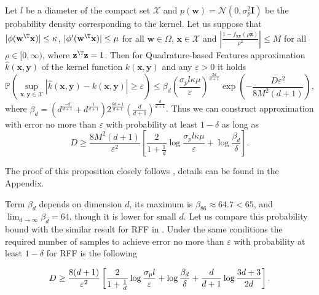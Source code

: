 \begin{proposition}
\label{prop:error_probability_bound}
Let $l$ be a diameter of the compact set $\mathcal{X}$ and 
$p(\mathbf{w}) = \mathcal{N}(0, \sigma_p^2 \mathbf{I})$ be the probability density corresponding to the kernel. Let us suppose that $|\phi(\mathbf{w}^{\T}\mathbf{x})| \leq \kappa$,
$|\phi'(\mathbf{w}^{\T} \mathbf{x})| \leq \mu$ for all $\mathbf{w} \in \Omega$,
$\mathbf{x} \in \mathcal{X}$ and
$\left |\frac{1 - f_{\mathbf{xy}}(\rho \mathbf{z})}{\rho^2} \right | \leq M$ for all $\rho \in [0, \infty)$, where $\mathbf{z}^{\T}\mathbf{z} = 1$. Then for Quadrature-based Features approximation $\hat{k}(\mathbf{x}, \mathbf{y})$ of the kernel function
$k(\mathbf{x}, \mathbf{y})$ and any $\varepsilon > 0$ it holds
\[
\mathbb{P} \left ( \sup_{\mathbf{x}, \mathbf{y} \in \mathcal{X}}|
\hat{k}(\mathbf{x}, \mathbf{y}) - k(\mathbf{x}, \mathbf{y})| \geq \varepsilon \right ) \leq
\beta_d
\left ( \frac{\sigma_p l \kappa \mu}{\varepsilon} \right )^{\frac{2d}{d + 1}}
\exp \left ( -\frac{D\varepsilon^2}{8M^2(d + 1)} \right ),
\]
where $\beta_d = \left (d^{\frac{-d}{d + 1}} + d^{\frac{1}{d + 1}}\right ) 2^\frac{6d + 1}{d + 1}
\left ( \frac{d}{d + 1} \right)^{\frac{d}{d + 1}}$. Thus we can construct approximation with error no more than $\varepsilon$ with probability at least $1 - \delta$ as long as
\[
D \geq \frac{8M^2(d + 1)}{\varepsilon^2} \left [
\frac{2}{1 + \frac{1}{d}}\log \frac{\sigma_p l \kappa \mu}{\varepsilon} + \log \frac{\beta_d}{\delta}
\right ].
\]
\end{proposition}

The proof of this proposition closely follows \citep{sutherland2015error}, details can be found in the Appendix.

Term $\beta_d$ depends on dimension $d$, its maximum is $\beta_{86} \approx 64.7 < 65$, and $\lim_{d \rightarrow \infty} \beta_d = 64$, though it is lower for small $d$. Let us compare this probability bound with the similar result for RFF in \citep{sutherland2015error}. Under the same conditions the required number of samples to achieve error no more than $\varepsilon$ with probability at least $1 - \delta$ for RFF is the following

\begin{align*}
D \geq \frac{8(d + 1)}{\varepsilon^2} \left [ 
\vphantom{\frac{2}{1 + \frac{1}{d}}\log \frac{\sigma_p l}{\varepsilon}}
\frac{2}{1 + \frac{1}{d}}\log \frac{\sigma_p l}{\varepsilon} + \log \frac{\beta_d}{\delta} + \frac{d}{d + 1}\log \frac{3d + 3}{2d}
\right ].
\end{align*}

